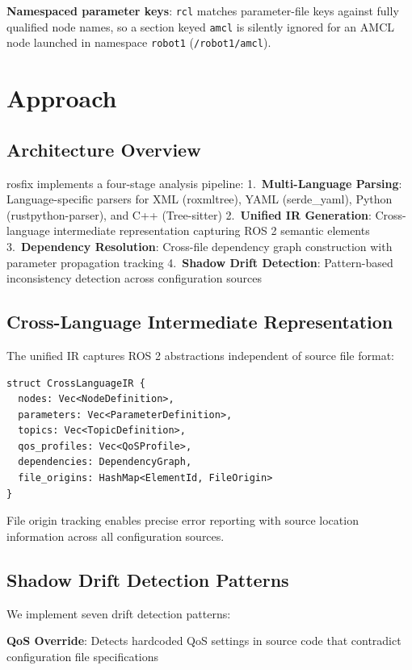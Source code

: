 \documentclass[conference]{IEEEtran}
\newcommand{\code}[1]{\texttt{#1}}
\begin{document}
\textbf{Namespaced parameter keys}: \code{rcl} matches parameter-file keys against fully
qualified node names, so a section keyed \code{amcl} is silently ignored for an AMCL node launched
in namespace \code{robot1} (\code{/robot1/amcl}).

\section{Approach}

\subsection{Architecture Overview}

rosfix implements a four-stage analysis pipeline:
1.~\textbf{Multi-Language Parsing}: Language-specific parsers for XML (roxmltree), YAML
(serde\_yaml), Python (rustpython-parser), and C++ (Tree-sitter)
2.~\textbf{Unified IR Generation}: Cross-language intermediate representation capturing ROS 2
semantic elements
3.~\textbf{Dependency Resolution}: Cross-file dependency graph construction with parameter
propagation tracking
4.~\textbf{Shadow Drift Detection}: Pattern-based inconsistency detection across configuration
sources

\subsection{Cross-Language Intermediate Representation}

The unified IR captures ROS 2 abstractions independent of source file format:
\begin{lstlisting}
struct CrossLanguageIR {
  nodes: Vec<NodeDefinition>,
  parameters: Vec<ParameterDefinition>,
  topics: Vec<TopicDefinition>,
  qos_profiles: Vec<QoSProfile>,
  dependencies: DependencyGraph,
  file_origins: HashMap<ElementId, FileOrigin>
}
\end{lstlisting}
File origin tracking enables precise error reporting with source location information across all
configuration sources.

\subsection{Shadow Drift Detection Patterns}

We implement seven drift detection patterns:

\textbf{QoS Override}: Detects hardcoded QoS settings in source code that contradict
configuration file specifications
\end{document}
